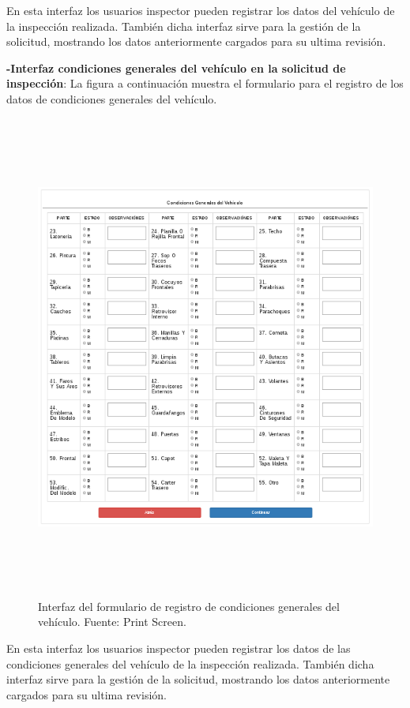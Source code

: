 En esta interfaz los usuarios inspector pueden registrar los datos del vehículo de la inspección realizada. También dicha interfaz sirve para la gestión de la solicitud, mostrando los datos anteriormente cargados para su ultima revisión.

\newpage
\textbf{-Interfaz condiciones generales del vehículo en la solicitud de inspección}: La figura a continuación muestra el formulario para el registro de los datos de condiciones generales del vehículo.

\begin{figure}[H]
\begin{center}
	\includegraphics[width=\textwidth,height=16cm]{img/interfaces/registro_condiciones_generales_vehiculo.png}
\end{center}
\caption{Interfaz del formulario de registro de condiciones generales del vehículo. Fuente: Print Screen.}
\label{fig:interfaz_registro_condiciones_vehiculo}
\end{figure}

En esta interfaz los usuarios inspector pueden registrar los datos de las condiciones generales del vehículo de la inspección realizada. También dicha interfaz sirve para la gestión de la solicitud, mostrando los datos anteriormente cargados para su ultima revisión.


